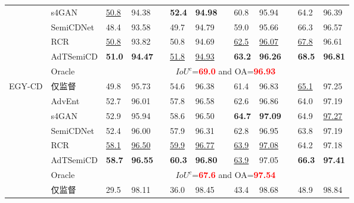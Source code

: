 \documentclass[lang=chs, degree=master, blindreview=false, adobe=false]{yanputhesis}
\begin{document}
\begin{table}[!htbp]
{\begin{tabular}{p{20mm}p{25mm}p{8mm}p{8mm}cp{8mm}p{8mm}cp{8mm}p{8mm}cp{8mm}p{8mm}}
      & s4GAN\cite{mittal2019semi}& \underline{50.8} & 94.38 && \cellcolor{mycyan}\textbf{52.4} & \cellcolor{mycyan}\textbf{94.98} && 60.8 & 95.94 && 64.2 & 96.39 \\
      & SemiCDNet\cite{peng2021SemiCDNet} & 48.4 & 93.58 && 49.7 & 94.79 && 59.0 & 95.66 && 66.3 & 96.57 \\ %
      & RCR\cite{bandara2022RCR}& \underline{50.8} & 93.82 && 50.8 & 94.69 && \underline{62.5} & \underline{96.07} && \underline{67.8} & 96.61 \\
      \rowcolor{mycyan}
      \multirow{-8}{*}{\cellcolor{white}}& \cellcolor{white}AdTSemiCD   &   \cellcolor{mycyan}\textbf{51.0} & \cellcolor{mycyan}\textbf{94.47} && \cellcolor{white}\underline{51.8} & \cellcolor{white}\underline{94.93} && \cellcolor{mycyan}\textbf{63.2} & \textbf{96.26} && \textbf{68.5} & \textbf{96.81} \\%
      \cline{2-13}
      & Oracle & \multicolumn{11}{c}{$ IoU^c$=\textcolor{red}{\bf 69.0} and OA=\textcolor{red}{\bf 96.93}} \\
      \bottomrule
      \multirow{8}{*}{EGY-CD}
      & 仅监督   &   49.8 & 95.73 && 54.6 & 96.38 && 61.4 & 96.83 && \underline{65.1} & 97.25 \\ %
      & AdvEnt\cite{vu2019advent}& 52.7 & 96.01 && 57.8 & 96.58 && 62.6 & 96.86 && 64.0 & 97.19 \\ %
      & s4GAN\cite{mittal2019semi}& 52.9 & 95.94 && 58.6 & 96.50 && \cellcolor{mycyan}\textbf{64.7} & \cellcolor{mycyan}\textbf{97.09} && 64.9 & \underline{97.27} \\
      & SemiCDNet\cite{peng2021SemiCDNet} & 52.4 & 96.00 && 57.9 & 96.31 && 62.8 & 96.95 && 63.8 & 97.19 \\ %
      & RCR\cite{bandara2022RCR}& \underline{58.1} & \underline{96.50} && \underline{59.9} & \underline{96.77} && \underline{63.9} & \underline{97.08} && 64.2 & 97.18 \\
      \rowcolor{mycyan}
      \multirow{-8}{*}{\cellcolor{white}}& \cellcolor{white}AdTSemiCD   &   \textbf{58.7} & \textbf{96.55} && \textbf{60.3} & \textbf{96.80} && \cellcolor{white}\underline{63.9} & \cellcolor{white}97.05 && \textbf{66.3} & \textbf{97.41} \\%
      \cline{2-13}
      & Oracle & \multicolumn{11}{c}{$ IoU^c$=\textcolor{red}{\bf 67.6} and OA=\textcolor{red}{\bf 97.54}} \\
      \bottomrule
      \multirow{8}{*}{HRCUS-CD}
      & 仅监督   &   29.5 & 98.11 && 36.0 & 98.45 && 43.4 & 98.68 && 48.9 & 98.84 \\ %

\end{tabular}}
\end{table}
\end{document}
